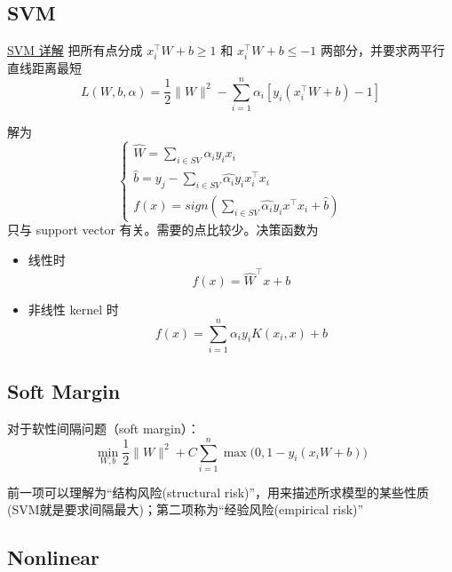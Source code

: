 \documentclass[12pt]{article}
\numberwithin{theorem}{section} %
\numberwithin{definition}{section} %
\numberwithin{assumption}{section} %
\numberwithin{lemma}{section} %
\numberwithin{remark}{section} %
\numberwithin{prop}{section} %
\numberwithin{corollary}{section} %
\numberwithin{example}{section} %
\numberwithin{question}{section} %
\numberwithin{problem}{section} %
\numberwithin{conjecture}{section} %
\numberwithin{append}{section} %
\numberwithin{property}{section} %
\begin{document}
\begin{CJK}{UTF8}{gbsn}
	\section{SVM}
	\href{https://zhuanlan.zhihu.com/p/49331510}{SVM 详解} 
	把所有点分成 $x_i^\intercal W+b\ge 1$ 和 $x_i^\intercal  W+b\le -1$ 两部分，并要求两平行直线距离最短
	\begin{equation}
		L(W,b,\alpha) = \frac{1}{2} \lVert W \rVert^2 - \sum\limits_{i=1}^n \alpha_i [y_i(x_i^\intercal W+b)-1]
	\end{equation}

解为
\begin{equation}
\begin{cases}
	\hat{W} = \sum\limits_{i\in SV} \hat{\alpha_i} y_i x_i\\
	\hat{b} = y_j - \sum\limits_{i\in SV} \hat{\alpha_i} y_i x_i^\intercal x_i\\
	f(x) = sign (\sum\limits_{i\in SV} \hat{\alpha_i}y_ix^\intercal x_i +\hat{b})
	\end{cases}
\end{equation}
只与 support vector 有关。需要的点比较少。决策函数为
\begin{itemize}
	\item 线性时 
	\begin{equation}
		f(x) = \hat{W}^\intercal x + b
	\end{equation}
	\item 非线性 kernel 时
	\begin{equation}
		f(x) = \sum_{i=1}^{n} \alpha_i y_i K(x_i, x) + b
	\end{equation}
\end{itemize}



\subsection{Soft Margin}
对于软性间隔问题（soft margin）： 
\begin{equation}
	\underset{W,b}{\min} \frac{1}{2}\lVert W \rVert^2 +C\sum\limits_{i=1}^n \max\big(0,1-y_i(x_iW+b)\big)
\end{equation}

前一项可以理解为“结构风险(structural risk)”，用来描述所求模型的某些性质(SVM就是要求间隔最大)；第二项称为“经验风险(empirical risk)”
	
\subsection{Nonlinear}


\end{CJK}
\end{document}
